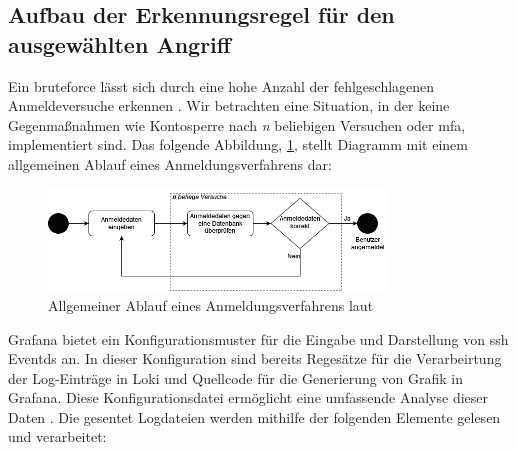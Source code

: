 \newpage
\subsection{Aufbau der Erkennungsregel für den ausgewählten Angriff}
Ein \gls{bruteforce} lässt sich durch eine hohe Anzahl der fehlgeschlagenen Anmeldeversuche erkennen \citep{Selvaganesh_SplunkBruteForce}. Wir betrachten eine Situation, in der keine Gegenmaßnahmen wie Kontosperre nach \textit{n} beliebigen Versuchen oder \gls{mfa}, implementiert sind. Das folgende Abbildung, \ref{fig:Aktivitaetsdiagramm_Anmeldung}, stellt Diagramm mit einem allgemeinen Ablauf eines Anmeldungsverfahrens dar:

\begin{figure}[H]
   \centering
   \includegraphics[width=0.8\textwidth]{assets/Anmeldeverfahren.drawio.png}
   \caption[Allgemeiner Ablauf eines Anmeldungsverfahrens]
   {Allgemeiner Ablauf eines Anmeldungsverfahrens laut \cite{Selvaganesh_SplunkBruteForce}}
   \label{fig:Aktivitaetsdiagramm_Anmeldung}
   \centering
\end{figure}

Grafana bietet ein Konfigurationsmuster für die Eingabe und Darstellung von \gls{ssh} Eventds an. In dieser Konfiguration sind bereits Regesätze für die
Verarbeirtung der Log-Einträge in Loki und Quellcode für die Generierung von Grafik in Grafana. Diese Konfigurationsdatei ermöglicht eine umfassende Analyse dieser Daten \citep{VoidQuark_sshlogs}. Die gesentet Logdateien werden mithilfe der folgenden Elemente gelesen und verarbeitet:



